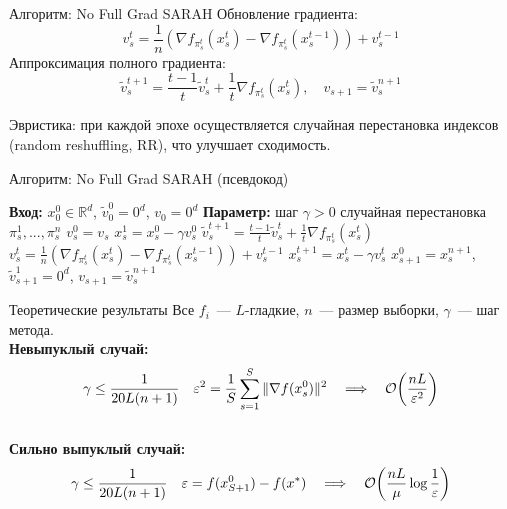 \documentclass{beamer}
\theoremstyle{plain}
\begin{document}
    \begin{frame}{Алгоритм: No Full Grad SARAH}
    Обновление градиента:
    \[
    v_s^{t} = \frac{1}{n}(\nabla f_{\pi_s^t}(x_s^t) - \nabla f_{\pi_s^t}(x_s^{t-1})) + v_s^{t-1}
    \]
    Аппроксимация полного градиента:
    \[
    \widetilde{v}_s^{t+1} = \frac{t-1}{t} \widetilde{v}_s^t + \frac{1}{t} \nabla f_{\pi_s^t}(x_s^t), \quad v_{s+1} = \widetilde{v}_s^{n+1}
    \]

    Эвристика: при каждой эпохе осуществляется случайная перестановка индексов (random reshuffling, RR), что улучшает сходимость.
    \end{frame}
    
    \begin{frame}[fragile]{Алгоритм: No Full Grad SARAH (псевдокод)}
    \begin{algorithmic}[1]
    \State \textbf{Вход:} \(x_0^0 \in \mathbb{R}^d\), \(\widetilde{v}_0^0 = 0^d\), \(v_0 = 0^d\)
    \State \textbf{Параметр:} шаг \(\gamma > 0\)
      \State случайная перестановка \(\pi_s^1, ..., \pi_s^n\)
      \State \(v_s^0 = v_s\)
      \State \(x_s^1 = x_s^0 - \gamma v_s^0\)
        \State \(\widetilde{v}_s^{t+1} = \frac{t-1}{t} \widetilde{v}_s^t + \frac{1}{t} \nabla f_{\pi_s^t}(x_s^t)\)
        \State \(v_s^t = \frac{1}{n}(\nabla f_{\pi_s^t}(x_s^t) - \nabla f_{\pi_s^t}(x_s^{t-1})) + v_s^{t-1}\)
        \State \(x_s^{t+1} = x_s^t - \gamma v_s^t\)
      \EndFor
      \State \(x_{s+1}^0 = x_s^{n+1}\), \(\widetilde{v}_{s+1}^1 = 0^d\), \(v_{s+1} = \widetilde{v}_s^{n+1}\)
    \EndFor
    \end{algorithmic}
    \end{frame}
    

\begin{frame}{Теоретические результаты}
    Все $f_i$~--- $L$-гладкие, $n$~---  размер выборки, $\gamma$~---  шаг метода.\\[1ex]
    
    \textbf{Невыпуклый случай:} 
    $$\gamma \le \frac{1}{20L(n+1)} \quad \varepsilon^2 = \frac{1}{S} \sum_{s=1}^{S} \|\nabla f(x_s^0)\|^2 \quad \Longrightarrow \quad  \order{\frac{nL}{\varepsilon^2}}$$ \\[0.7ex]
    
    \textbf{Сильно выпуклый случай:}
    $$\gamma \le \frac{1}{20L(n+1)} \quad  \varepsilon = f(x_{S+1}^0) - f(x^*) \quad \Longrightarrow \quad  \order{\frac{nL}{\mu} \log \frac{1}{\varepsilon}}$$
\end{frame}
    
\end{document}
